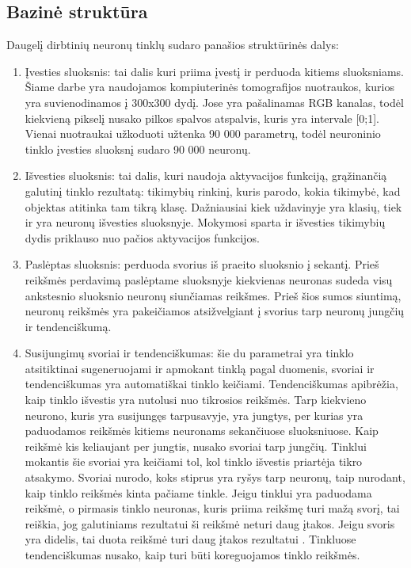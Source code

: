 \documentclass{VUMIFInfKursinis}
\begin{document}
\subsection{Bazinė struktūra}
Daugelį dirbtinių neuronų tinklų sudaro panašios struktūrinės dalys:
\begin{enumerate}
  \item Įvesties sluoksnis: tai dalis kuri priima įvestį ir perduoda kitiems sluoksniams.
  Šiame darbe yra naudojamos kompiuterinės tomografijos nuotraukos, kurios yra suvienodinamos
  į 300x300 dydį. Jose yra pašalinamas RGB kanalas, todėl kiekvieną pikselį nusako
  pilkos spalvos atspalvis, kuris yra intervale [0;1]. Vienai nuotraukai užkoduoti
  užtenka 90 000 parametrų, todėl neuroninio tinklo įvesties sluoksnį sudaro 90 000 neuronų.
  \item Išvesties sluoksnis: tai dalis, kuri naudoja aktyvacijos funkciją, grąžinančią galutinį tinklo rezultatą: tikimybių rinkinį,
  kuris parodo, kokia tikimybė, kad objektas atitinka tam tikrą klasę. Dažniausiai kiek
  uždavinyje yra klasių, tiek ir yra neuronų išvesties sluoksnyje.
  Mokymosi sparta ir išvesties tikimybių dydis priklauso nuo pačios aktyvacijos funkcijos. 
  \item Paslėptas sluoksnis: perduoda svorius iš praeito sluoksnio į sekantį. Prieš reikšmės perdavimą paslėptame
  sluoksnyje kiekvienas neuronas sudeda visų ankstesnio sluoksnio neuronų siunčiamas reikšmes. Prieš šios sumos siuntimą,
  neuronų reikšmės yra pakeičiamos atsižvelgiant į svorius tarp neuronų jungčių ir
  tendenciškumą.
  \item Susijungimų svoriai ir tendenciškumas: šie du parametrai yra
  tinklo atsitiktinai sugeneruojami ir apmokant tinklą pagal
  duomenis, svoriai ir tendenciškumas
  yra automatiškai tinklo keičiami. Tendenciškumas apibrėžia, kaip tinklo išvestis yra nutolusi
  nuo tikrosios reikšmės. Tarp
  kiekvieno neurono, kuris yra susijungęs tarpusavyje, yra jungtys, per
  kurias yra paduodamos reikšmės kitiems neuronams sekančiuose sluoksniuose.
  Kaip reikšmė kis keliaujant per jungtis, nusako svoriai tarp jungčių. Tinklui mokantis
  šie svoriai yra keičiami tol, kol tinklo išvestis priartėja tikro atsakymo. Svoriai
  nurodo, koks stiprus yra ryšys tarp neuronų, taip nurodant, kaip tinklo reikšmės kinta pačiame tinkle.
  Jeigu tinklui yra paduodama reikšmė, o pirmasis tinklo neuronas, kuris priima reikšmę turi mažą
  svorį, tai reiškia, jog galutiniams rezultatui ši reikšmė neturi daug įtakos. Jeigu svoris yra
  didelis, tai duota reikšmė turi daug įtakos rezultatui \cite{salt2}. Tinkluose tendenciškumas nusako, kaip turi būti koreguojamos tinklo reikšmės.

\end{enumerate}
\end{document}
